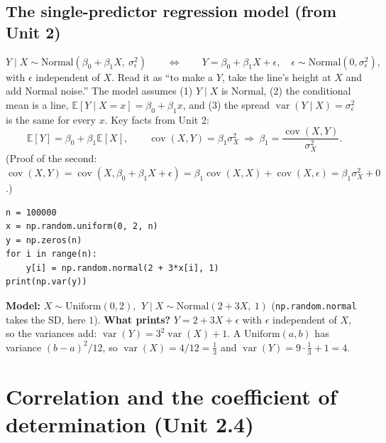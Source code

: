 \documentclass[11pt]{article}
\newcommand{\E}{\mathbb{E}}
\newcommand{\Var}{\operatorname{var}}
\newcommand{\Cov}{\operatorname{cov}}
\newcommand{\given}{\mid}
\newcommand{\Norm}{\text{Normal}}
\newcommand{\py}[1]{\texttt{#1}}
\begin{document}
\subsection{The single-predictor regression model (from Unit 2)}\label{sec:regmodel}
\[
Y\given X\sim\Norm(\beta_0+\beta_1X,\ \sigma_\epsilon^2)\qquad\Longleftrightarrow\qquad Y=\beta_0+\beta_1X+\epsilon,\quad \epsilon\sim\Norm(0,\sigma_\epsilon^2),
\]
with $\epsilon$ independent of $X$. Read it as ``to make a $Y$, take the line's height at $X$ and add Normal noise.'' The model assumes
(1) $Y\given X$ is Normal, (2) the conditional mean is a line, $\E[Y\given X=x]=\beta_0+\beta_1x$, and (3) the spread $\Var(Y\given X)=\sigma_\epsilon^2$
is the same for every $x$. Key facts from Unit 2:
\[
\E[Y]=\beta_0+\beta_1\E[X],\qquad \Cov(X,Y)=\beta_1\sigma_X^2\ \Longrightarrow\ \beta_1=\frac{\Cov(X,Y)}{\sigma_X^2}.
\]
(Proof of the second: $\Cov(X,Y)=\Cov(X,\beta_0+\beta_1X+\epsilon)=\beta_1\Cov(X,X)+\Cov(X,\epsilon)=\beta_1\sigma_X^2+0$.)

\begin{examplebox}[title={Example (Lecture 7): from code to a model to a number}]
\begin{lstlisting}
n = 100000
x = np.random.uniform(0, 2, n)
y = np.zeros(n)
for i in range(n):
    y[i] = np.random.normal(2 + 3*x[i], 1)
print(np.var(y))
\end{lstlisting}
\textbf{Model:} $X\sim\text{Uniform}(0,2)$, $\ Y\given X\sim\Norm(2+3X,\ 1)$ (\py{np.random.normal} takes the SD, here $1$).
\textbf{What prints?} $Y=2+3X+\epsilon$ with $\epsilon$ independent of $X$, so the variances add:
$\Var(Y)=3^2\Var(X)+1$. A $\text{Uniform}(a,b)$ has variance $(b-a)^2/12$, so $\Var(X)=4/12=\tfrac13$ and $\Var(Y)=9\cdot\tfrac13+1=4$.
\end{examplebox}

\section{Correlation and the coefficient of determination (Unit 2.4)}
\end{document}
